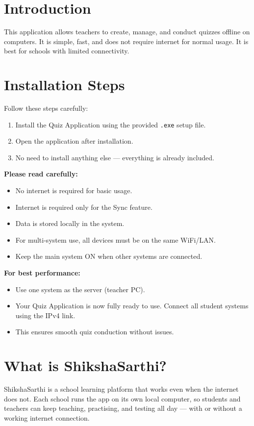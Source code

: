 \documentclass[12pt,a4paper]{article}
\begin{document}
\section*{Introduction}
This application allows teachers to create, manage, and conduct quizzes offline on
computers. It is simple, fast, and does not require internet for normal usage. It
is best for schools with limited connectivity.

\section*{Installation Steps}
Follow these steps carefully:
\begin{enumerate}[leftmargin=*]
  \item Install the Quiz Application using the provided \texttt{.exe} setup file.
  \item Open the application after installation.
  \item No need to install anything else --- everything is already included.
\end{enumerate}

\textbf{Please read carefully:}
\begin{itemize}[leftmargin=*]
  \item No internet is required for basic usage.
  \item Internet is required only for the Sync feature.
  \item Data is stored locally in the system.
  \item For multi-system use, all devices must be on the same WiFi/LAN.
  \item Keep the main system ON when other systems are connected.
\end{itemize}

\textbf{For best performance:}
\begin{itemize}[leftmargin=*]
  \item Use one system as the server (teacher PC).
  \item Your Quiz Application is now fully ready to use. Connect all student systems using the IPv4 link.
  \item This ensures smooth quiz conduction without issues.
\end{itemize}

\section*{What is ShikshaSarthi?}
ShikshaSarthi is a school learning platform that works even when the internet does not.
Each school runs the app on its own local computer, so students and teachers can keep
teaching, practising, and testing all day --- with or without a working internet connection.
\end{document}
